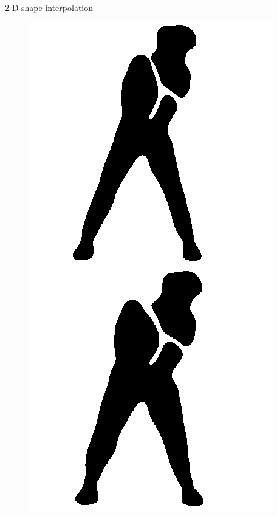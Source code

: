 \begin{frame}{2-D shape interpolation}
\begin{figure}
        \vspace{.3em}
        \begin{minipage}[t]{0.08\linewidth}
            \vspace{0pt}
            \centering
            \includegraphics[width=\textwidth]{png/kun-chicken/shape-1-1.png}
        \end{minipage}
        \hfill
        \begin{minipage}[t]{0.08\linewidth}
            \vspace{0pt}
            \centering
            \includegraphics[width=\textwidth]{png/kun-chicken/shape-1-2.png}

\end{minipage}
\end{figure}
\end{frame}
